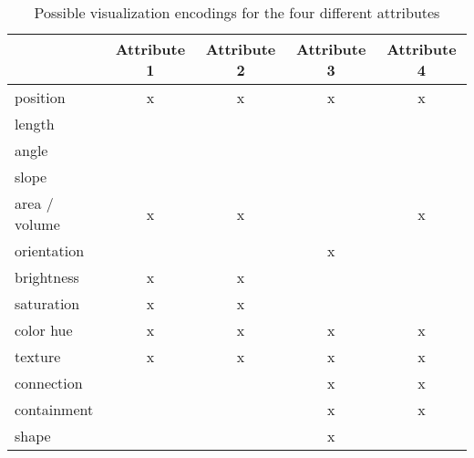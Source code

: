 \begin{table}[ht]
	\centering
		\begin{tabular}{l|cccc}
										& Attribute 1 & Attribute 2 & Attribute 3 & Attribute 4 \\
			\hline
		  position 		  &		 	 x			&			 x			&		   x			&			 x			\\
			length				&							&							&							&							\\
			angle					&							&							&							&							\\
			slope					&							&							&							&							\\
			area / volume	& 		 x			&			 x			&							&			 x			\\
			orientation		&							&							&			 x			&							\\
			brightness		& 		 x			&			 x			&							&							\\
			saturation		& 		 x			&			 x			&							&							\\
			color hue			& 		 x			&			 x			&			 x			&			 x			\\
			texture				& 		 x			&			 x			&			 x			&			 x			\\
			connection		&							&							&			 x			&			 x			\\
			containment		&						  &							&			 x			&			 x			\\
			shape		  		&							&							&			 x			&							\\
		\end{tabular}
	\caption{Possible visualization encodings for the four different attributes}
	\label{table:attributeEncodings}
\end{table}
